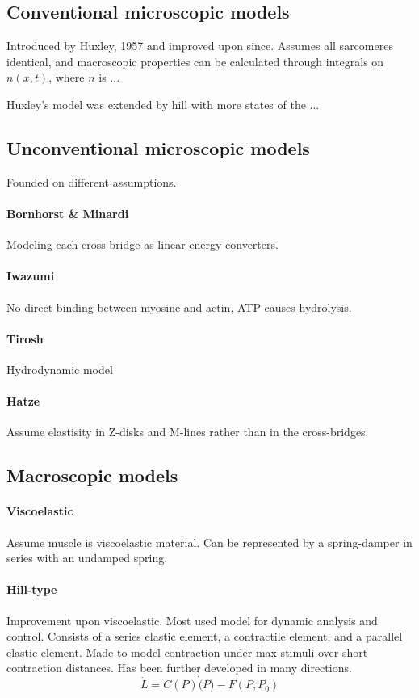 \subsection{Conventional microscopic models}
Introduced by Huxley, 1957 and improved upon since. Assumes all sarcomeres identical, and macroscopic properties can be calculated through integrals on $n(x,t)$, where $n$ is ...

Huxley's model was extended by hill with more states of the ...

\subsection{Unconventional microscopic models}
Founded on different assumptions.
\paragraph{Bornhorst \& Minardi} Modeling each cross-bridge as linear energy converters.
\paragraph{Iwazumi} No direct binding between myosine and actin, ATP causes hydrolysis.
\paragraph{Tirosh} Hydrodynamic model
\paragraph{Hatze} Assume elastisity in Z-disks and M-lines rather than in the cross-bridges.

\subsection{Macroscopic models}
\paragraph{Viscoelastic} Assume muscle is viscoelastic material. Can be represented by a spring-damper in series with an undamped spring.
\paragraph{Hill-type} Improvement upon viscoelastic. Most used model for dynamic analysis and control.  Consists of a series elastic element, a contractile element, and a parallel elastic element. Made to model contraction under max stimuli over short contraction distances. Has been further developed in many directions.
\begin{equation}
    \dot{L} = C(P) \dot(P) - F(P, P_0)
\end{equation}

